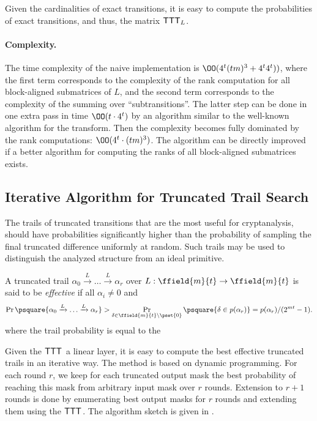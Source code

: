 Given the cardinalities of exact transitions, it is easy to compute the probabilities of exact transitions, and thus, the matrix $\mathsf{TTT}_{L}$.

\paragraph{Complexity.}
The time complexity of the naive implementation is $\OO(4^t(tm)^3 + 4^t4^t))$, where the first term corresponds to the complexity of the rank computation for all block-aligned submatrices of $L$, and the second term corresponds to the complexity of the summing over ``subtransitions''. The latter step can be done in one extra pass in time $\OO(t \cdot 4^t)$ by an algorithm similar to the well-known algorithm for the \Mobius{} transform. Then the complexity becomes fully dominated by the rank computations: $\OO(4^t\cdot (tm)^3)$.
The algorithm can be directly improved if a better algorithm for computing the ranks of all block-aligned submatrices exists.


\subsection{Iterative Algorithm for Truncated Trail Search}

The trails of truncated transitions that are the most useful for cryptanalysis, should have probabilities significantly higher than the probability of sampling the final truncated difference uniformly at random. Such trails may be used to distinguish the analyzed structure from an ideal primitive.

\begin{definition}
A truncated trail $\alpha_0 \xrightarrow{L} \ldots \xrightarrow{L} \alpha_r$ over $L: \ffield{m}{t} \to \ffield{m}{t}$ is said to be \emph{effective} if all $\alpha_i \ne 0$ and 
$$
\Pr\psquare{\alpha_0 \xrightarrow{L} \ldots \xrightarrow{L} \alpha_r} > 
\Pr_{\delta \in \ffield{m}{t}\setminus\pset{0}} \psquare{\delta \in p(\alpha_r)} = p(\alpha_r)/(2^{mt}-1).
$$
where the trail probability is equal to the 
\end{definition}

Given the $\mathsf{TTT}_{}$ a linear layer, it is easy to compute the best effective truncated trails in an iterative way. The method is based on dynamic programming. For each round $r$, we keep for each truncated output mask the best probability of reaching this mask from arbitrary input mask over $r$ rounds. Extension to $r+1$ rounds is done by enumerating best output masks for $r$ rounds and extending them using the $\mathsf{TTT}_{}$. The algorithm sketch is given in .

